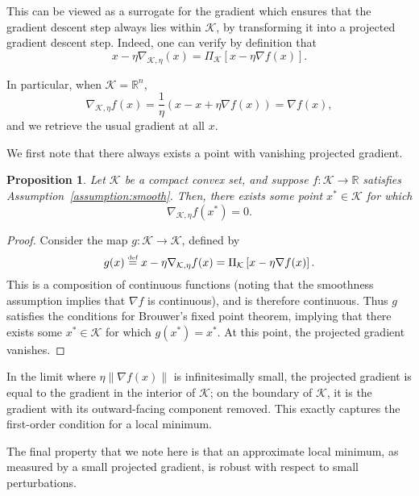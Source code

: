 \documentclass{article}
\def\reals{{\mathbb R}}
\def\norm#1{\mathopen\| #1 \mathclose\|}
\newcommand{\equaldef}{\stackrel{\text{\tiny def}}{=}}
\def\reals{{\mathbb R}}
\newcommand{\K}{\ensuremath{\mathcal K}}
\newcommand{\bra}[1]{\left[#1\right]}
\newcommand{\R}{\mathbb{R}}
\newtheorem{proposition}[theorem]{Proposition}
\renewcommand{\K}{\mathcal{K}}
\begin{document}
This can be viewed as a surrogate for the gradient which ensures that the gradient descent step always lies within $\K$, by transforming it into a projected gradient descent step. Indeed, one can verify by definition that
\[x - \eta \nabla_{\K, \eta}(x) = \Pi_\K\bra{ x - \eta \nabla f(x) }.\]

In particular, when $\K = \reals^n$,
\[\nabla_{\K,\eta} f(x) = \frac{1}{\eta}(x - x + \eta \nabla f(x)) = \nabla f(x),\] 
and we retrieve the usual gradient at all $x$.

We first note that there always exists a point with vanishing projected gradient.

\begin{proposition}
\label{fixed-point}
Let $\K$ be a compact convex set, and suppose $f : \K \rightarrow \R$ satisfies Assumption~\ref{assumption:smooth}. Then, there exists some point $x^* \in \K$ for which
\begin{equation*}
\nabla_{\K,\eta} f(x^*) = 0.
\end{equation*}
\end{proposition}
\begin{proof}
Consider the map $g : \K \rightarrow \K$, defined by
\begin{equation*}
g(x) \equaldef x - \eta \nabla_{\K, \eta} f(x) = \Pi_\K \bra{ x - \eta \nabla f(x) }.
\end{equation*}
This is a composition of continuous functions (noting that the smoothness assumption implies that $\nabla f$ is continuous), and is therefore continuous. Thus $g$ satisfies the conditions for Brouwer's fixed point theorem, implying that there exists some $x^* \in \K$ for which $g(x^*) = x^*$. At this point, the projected gradient vanishes.
\end{proof}

In the limit where $\eta \norm{\nabla f(x)}$ is infinitesimally small, the projected gradient is equal to the gradient in the interior of $\K$; on the boundary of $\K$, it is the gradient with its outward-facing component removed. This exactly captures the first-order condition for a local minimum.

The final property that we note here is that an approximate local minimum, as measured by a small projected gradient, is robust with respect to small perturbations.
\end{document}
